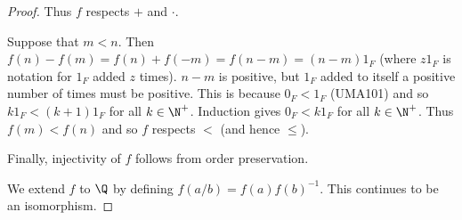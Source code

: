 \begin{proof}
    Thus $f$ respects $+$ and $\cdot$.

    Suppose that $m < n$.
    Then $f(n) - f(m) = f(n) + f(-m) = f(n - m) = (n - m) 1_F$ (where
    $z 1_F$ is notation for $1_F$ added $z$ times).
    $n - m$ is positive, but $1_F$ added to itself a positive number of times
    must be positive.
    This is because $0_F < 1_F$ (UMA101) and so $k 1_F < (k + 1) 1_F$ for all
    $k \in \N^+$.
    Induction gives $0_F < k 1_F$ for all $k \in \N^+$.
    Thus $f(m) < f(n)$ and so $f$ respects $<$ (and hence $\le$).

    Finally, injectivity of $f$ follows from order preservation.

    We extend $f$ to $\Q$ by defining $f(a/b) = f(a) f(b)^{-1}$.
    This continues to be an isomorphism.
\end{proof}

